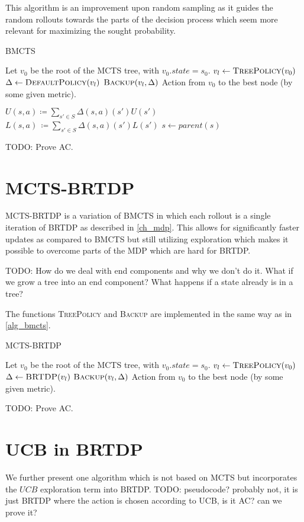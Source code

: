 This algorithm is an improvement upon random sampling as it guides the
random rollouts towards the parts of the decision process which seem
more relevant for maximizing the sought probability.

\begin{algorithm}
\caption{BMCTS}
\label{alg_bmcts}
\begin{algorithmic}
    \State Let $v_0$ be the root of the MCTS tree, with $v_0.state = s_0$.
        \State $v_l \gets \Call{TreePolicy}{v_0}$
        \State $\Delta \gets \Call{DefaultPolicy}{v_l}$
        \State $\Call{Backup}{v_l, \Delta}$
    \EndWhile
    \State \Return Action from $v_0$ to the best node (by some
    given metric).
\EndFunction

\EndFunction

\Repeat
{}
\EndFunction

\Repeat
    \State $U(s,a) \coloneqq \sum_{s' \in S} \Delta(s,a)(s')U(s')$
    \State $L(s,a)\, \coloneqq \sum_{s' \in S} \Delta(s,a)(s')L(s')$
    \State $s \gets parent(s)$
\EndFunction
\end{algorithmic}
\end{algorithm}


TODO: Prove AC.


\section{MCTS-BRTDP}

MCTS-BRTDP is a variation of BMCTS in which each rollout is a
single iteration of BRTDP as described in \autoref{ch_mdp}. This allows
for significantly faster updates as compared to BMCTS but still
utilizing exploration which makes it possible to overcome parts of the
MDP which are hard for BRTDP.

TODO: How do we deal with end components and why we don't do it. What if
we grow a tree into an end component? What happens if a state already is
in a tree?

The functions \textsc{TreePolicy} and \textsc{Backup} are implemented in
the same way as in \autoref{alg_bmcts}.


\begin{algorithm}
\caption{MCTS-BRTDP}
\label{mcts-brtdp}
\begin{algorithmic}
    \State Let $v_0$ be the root of the MCTS tree, with $v_0.state = s_0$.
        \State $v_l \gets \Call{TreePolicy}{v_0}$
        \State $\Delta \gets \Call{BRTDP}{v_l}$ %
        \State $\Call{Backup}{v_l, \Delta}$
    \EndWhile
    \State \Return Action from $v_0$ to the best node (by some
    given metric).
\EndFunction

\end{algorithmic}
\end{algorithm}

TODO: Prove AC.


\section{UCB in BRTDP}

We further present one algorithm which is not based on MCTS but
incorporates the $UCB$ exploration term into BRTDP. TODO: pseudocode?
probably not, it is just BRTDP where the action is chosen according to
UCB, is it AC? can we prove it?
